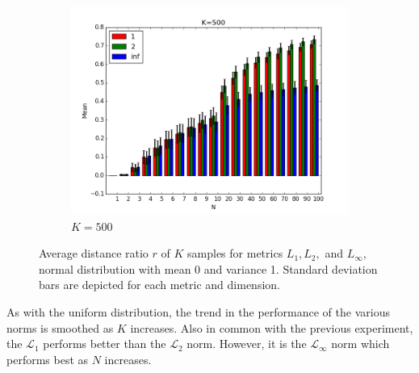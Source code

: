 \documentclass{article}
\begin{document}
\begin{figure}[H]
\centering
   \ContinuedFloat 
    \begin{subfigure}[h]{0.9\textwidth}
        \includegraphics[width=\textwidth]{l-experiment2-500-inf.png}
        \caption{$K=500$}
        \label{fig:exp2k500}
    \end{subfigure}
    \caption{Average distance ratio $r$ of $K$ samples for metrics $L_1,L_2,$ and $L_{\infty}$, normal distribution with mean 0 and variance 1. Standard deviation bars are depicted for each metric and dimension.}\label{fig:exp2}
\end{figure}
As with the uniform distribution, the trend in the performance of the various norms is smoothed as $K$ increases. Also in common with the previous experiment, the $\mathcal{L}_1$ performs better than the $\mathcal{L}_2$ norm. However, it is the $\mathcal{L}_{\infty}$ norm which performs best as $N$ increases.
\
\end{document}
